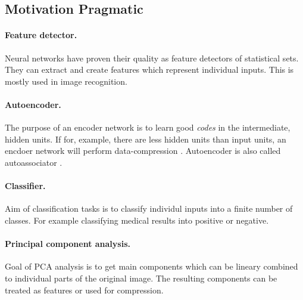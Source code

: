 




\subsection*{Motivation Pragmatic}

\paragraph{Feature detector.}
Neural networks have proven their quality as feature detectors of statistical sets. They can extract and create features which represent individual inputs. This is mostly used in image recognition. 

\paragraph{Autoencoder.}
The purpose of an encoder network is to learn good \textit{codes} in the intermediate, hidden units. If for, example, there are less hidden units than input units, an encdoer network will perform data-compression  \cite{hinton1988learning}. Autoencoder is also called autoassociator \cite{bengio2009learning}.

\paragraph{Classifier.}
Aim of classification tasks is to classify individul inputs into a finite number of classes. For example classifying medical results into positive or negative. 

\paragraph{Principal component analysis.}
Goal of PCA analysis is to get main components which can be lineary combined to individual parts of the original image. The resulting components can be treated as features or used for compression. 


